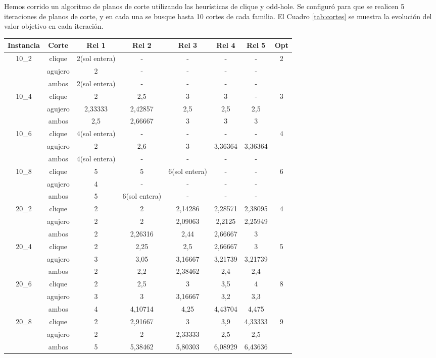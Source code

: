 \documentclass[a4paper]{article}
\begin{document}
Hemos corrido un algoritmo de planos de corte utilizando las heurísticas de clique y odd-hole.  Se configuró para que se realicen 5 iteraciones de planos de corte, y en cada una se busque hasta 10 cortes de cada familia.  El Cuadro \ref{tab:cortes} se muestra la evolución del valor objetivo en cada iteración.
\begin{center}
\begin{longtable}{|c|c|c|c|c|c|c|c|}
\hline
Instancia&Corte&Rel 1&Rel 2&Rel 3&Rel 4&Rel 5&Opt\\
\hline
\hline
10_2&clique&2(sol entera)&-&-&-&-&2\\
\cline{2-7}
&agujero&2&-&-&-&-&\\
\cline{2-7}
&ambos&2(sol entera)&-&-&-&-&\\
\hline
10_4&clique&2&2,5&3&3&-&3\\
\cline{2-7}
&agujero&2,33333&2,42857&2,5&2,5&2,5&\\
\cline{2-7}
&ambos&2,5&2,66667&3&3&3&\\
\hline
10_6&clique&4(sol entera)&-&-&-&-&4\\
\cline{2-7}
&agujero&2&2,6&3&3,36364&3,36364&\\
\cline{2-7}
&ambos&4(sol entera)&-&-&-&-&\\
\hline
10_8&clique&5&5&6(sol entera)&-&-&6\\
\cline{2-7}
&agujero&4&-&-&-&-&\\
\cline{2-7}
&ambos&5&6(sol entera)&-&-&-&\\
\hline
20_2&clique&2&2&2,14286&2,28571&2,38095&4\\
\cline{2-7}
&agujero&2&2&2,09063&2,2125&2,25949&\\
\cline{2-7}
&ambos&2&2,26316&2,44&2,66667&3&\\
\hline
20_4&clique&2&2,25&2,5&2,66667&3&5\\
\cline{2-7}
&agujero&3&3,05&3,16667&3,21739&3,21739&\\
\cline{2-7}
&ambos&2&2,2&2,38462&2,4&2,4&\\
\hline
20_6&clique&2&2,5&3&3,5&4&8\\
\cline{2-7}
&agujero&3&3&3,16667&3,2&3,3&\\
\cline{2-7}
&ambos&4&4,10714&4,25&4,43704&4,475&\\
\hline
20_8&clique&2&2,91667&3&3,9&4,33333&9\\
\cline{2-7}
&agujero&2&2&2,33333&2,5&2,5&\\
\cline{2-7}
&ambos&5&5,38462&5,80303&6,08929&6,43636&\\

\end{longtable}
\end{center}
\end{document}
